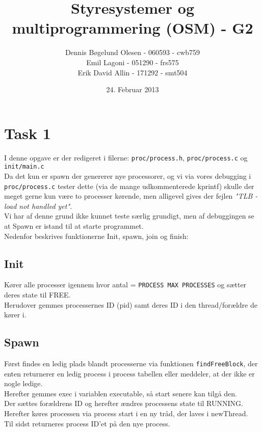 \documentclass[a4paper,12pt]{article}
\title{Styresystemer og multiprogrammering (OSM) - G2}
\author{Dennis Bøgelund Olesen - 060593 - cwb759 \\ Emil Lagoni - 051290 - frs575 \\ Erik David Allin - 171292 - smt504}
\date{24. Februar 2013}
\begin{document}
\maketitle %
\thispagestyle{empty}
\setcounter{page}{0}
\newpage




\section*{Task 1}
I denne opgave er der redigeret i filerne: \texttt{proc/process.h}, \texttt{proc/process.c} og \texttt{init/main.c}
\\[5px]
Da det kun er spawn der genererer nye processorer, og vi via vores debugging i \texttt{proc/process.c} tester dette (via de mange udkommenterede kprintf) skulle der meget gerne kun være to processer kørende, men alligevel gives der fejlen \textit{"TLB - load not handled yet". }
\\
Vi har af denne grund ikke kunnet teste særlig grundigt, men af debuggingen se at Spawn er istand til at starte programmet. 
\\[5px]
Nedenfor beskrives funktionerne Init, spawn, join og finish:
\subsection*{Init}
Kører alle processer igennem hvor antal = \texttt{PROCESS MAX PROCESSES} og sætter deres state til FREE. 
\\
Herudover gemmes processernes ID (pid) samt deres ID i den thread/forældre de kører i. 


\subsection*{Spawn}
Først findes en ledig plads blandt processerne via funktionen \texttt{findFreeBlock}, der enten returnerer en ledig process i process tabellen eller meddeler, at der ikke er nogle ledige. 
\\
Herefter gemmes exec i variablen executable, så start senere kan tilgå den. \\
Der sættes forældrens ID og herefter ændres processens state til RUNNING.
\\
Herefter køres processen via process start i en ny tråd, der laves i newThread.
\\
Til sidst returneres process ID'et på den nye process.
\end{document}
